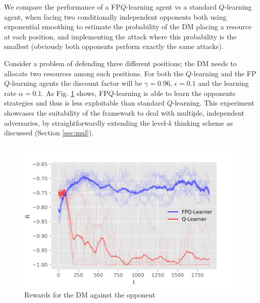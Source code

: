 
We compare the performance of a FP$Q$-learning agent vs a standard $Q$-learning agent, when facing two conditionally independent opponents both using 
exponential smoothing to estimate the probability of the DM placing a resource at each position, and implementing the attack where
this probability is the smallest (obviously both opponents perform exactly the same attacks).

Consider
a problem of defending three different positions; the DM needs to allocate two resources among such positions. For both the $Q$-learning and the FP$Q$-learning agents the discount factor will be $\gamma = 0.96$, $\epsilon = 0.1$ and the learning rate $\alpha = 0.1$. %
%
As Fig. \ref{fig:2expsmoothers} shows, FP$Q$-learning is able to learn the opponents strategies and thus is less exploitable than standard $Q$-learning.
This experiment showcases the suitability of the framework to deal with multiple, independent adversaries, by straightforwardly extending the level-$k$ thinking scheme as discussed (Section \ref{sec:mul}).
\begin{figure}%
\centering
\includegraphics[scale=0.5]{figures/2expsmoothers.png}%
\caption{Rewards for the DM against the opponent}\label{fig:2expsmoothers}
\end{figure}
%




